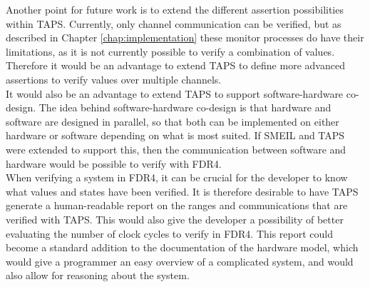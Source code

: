 Another point for future work is to extend the different assertion possibilities within TAPS. Currently, only channel communication can be verified, but as described in Chapter \ref{chap:implementation}
these monitor processes do have their limitations, as it is not currently possible to verify a combination of values. Therefore it would be an advantage to extend TAPS to define more advanced assertions to verify values over multiple channels. \\

It would also be an advantage to extend TAPS to support software-hardware co-design. The idea behind software-hardware co-design is that hardware and software are designed in parallel, so that both can be implemented on either hardware or software depending on what is most suited. If SMEIL and TAPS were extended to support this, then the communication between software and hardware would be possible to verify with FDR4. \\

When verifying a system in FDR4, it can be crucial for the developer to know what values and states have been verified. It is therefore desirable to have TAPS generate a human-readable report on the ranges and communications that are verified with TAPS. This would also give the developer a possibility of better evaluating the number of clock cycles to verify in FDR4.
This report could become a standard addition to the documentation of the hardware model, which would give a programmer an easy overview of a complicated system, and would also allow for reasoning about the system.